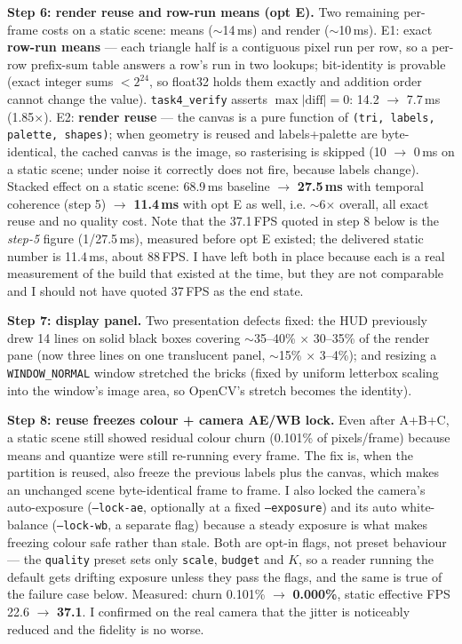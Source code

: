 \documentclass[11pt,a4paper]{article}
\begin{document}
\textbf{Step 6: render reuse and row-run means (opt E).} Two remaining per-frame
costs on a static scene: means ($\sim$14\,ms) and render ($\sim$10\,ms). E1:
exact \textbf{row-run means} --- each triangle half is a contiguous pixel run per
row, so a per-row prefix-sum table answers a row's run in two lookups;
bit-identity is provable (exact integer sums $< 2^{24}$, so float32 holds them
exactly and addition order cannot change the value). \texttt{task4\_verify}
asserts $\max|\mathrm{diff}| = 0$: 14.2 $\rightarrow$ 7.7\,ms (1.85$\times$). E2:
\textbf{render reuse} --- the canvas is a pure function of
\texttt{(tri, labels, palette, shapes)}; when geometry is reused and
labels+palette are byte-identical, the cached canvas is the image, so rasterising
is skipped (10 $\rightarrow$ 0\,ms on a static scene; under noise it correctly
does not fire, because labels change). Stacked effect on a static scene: 68.9\,ms
baseline $\rightarrow$ \textbf{27.5\,ms} with temporal coherence (step 5)
$\rightarrow$ \textbf{11.4\,ms} with opt E as well, i.e. $\sim$6$\times$
overall, all exact reuse and no quality cost. Note that the 37.1\,FPS quoted in
step 8 below is the \emph{step-5} figure (1/27.5\,ms), measured before opt E
existed; the delivered static number is 11.4\,ms, about 88\,FPS. I have left both
in place because each is a real measurement of the build that existed at the
time, but they are not comparable and I should not have quoted 37\,FPS as the end
state.

\textbf{Step 7: display panel.} Two presentation defects fixed: the HUD
previously drew 14 lines on solid black boxes covering $\sim$35--40\% $\times$
30--35\% of the render pane (now three lines on one translucent panel,
$\sim$15\% $\times$ 3--4\%); and resizing a \texttt{WINDOW\_NORMAL} window
stretched the bricks (fixed by uniform letterbox scaling into the window's image
area, so OpenCV's stretch becomes the identity).

\textbf{Step 8: reuse freezes colour + camera AE/WB lock.} Even after A+B+C, a
static scene still showed residual colour churn (0.101\% of pixels/frame)
because means and quantize were still re-running every frame. The fix is, when
the partition is reused, also freeze the previous labels plus the canvas, which
makes an unchanged scene byte-identical frame to frame. I also locked the
camera's auto-exposure (\texttt{--lock-ae}, optionally at a fixed
\texttt{--exposure}) and its auto white-balance (\texttt{--lock-wb}, a separate
flag) because a steady exposure is what makes freezing colour safe rather than
stale. Both are opt-in flags, not preset behaviour --- the \texttt{quality}
preset sets only \texttt{scale}, \texttt{budget} and $K$, so a reader running the
default gets drifting exposure unless they pass the flags, and the same is true
of the failure case below. Measured: churn 0.101\% $\rightarrow$ \textbf{0.000\%},
static effective FPS 22.6 $\rightarrow$ \textbf{37.1}. I confirmed on the real
camera that the jitter is noticeably reduced and the fidelity is no worse.
\end{document}
